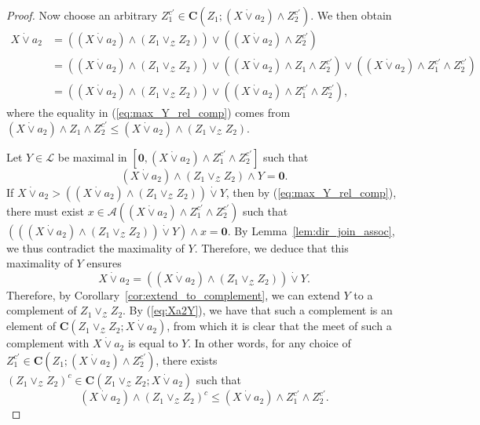 \documentclass[a4paper,11pt,reqno]{article}
\theoremstyle{definition}
\newcommand{\zero}{{\mathbf{0}}}
\begin{document}
\begin{proof}
Now choose an arbitrary $Z_1^{c'}\in\mathbf{C}(Z_1;(X\dot\vee a_2)\wedge Z_2^{c'})$. We then obtain
\begin{align}
    X \dot\vee a_2 &= ((X \dot\vee a_2) \wedge (Z_1 \vee_\mathcal{Z} Z_2)) \vee ((X \dot\vee a_2) \wedge Z_2^{c'})\nonumber \\
    &= ((X \dot\vee a_2) \wedge (Z_1 \vee_\mathcal{Z} Z_2)) \vee ((X \dot\vee a_2)\wedge Z_1 \wedge Z_2^{c'}) \vee ((X \dot\vee a_2)\wedge Z_1^{c'} \wedge Z_2^{c'})\nonumber \\
    &= ((X \dot\vee a_2) \wedge (Z_1 \vee_\mathcal{Z} Z_2)) \vee ((X \dot\vee a_2)\wedge Z_1^{c'} \wedge Z_2^{c'}),\label{eq:max_Y_rel_comp}
\end{align}
where the equality in (\ref{eq:max_Y_rel_comp}) comes from $(X\dot\vee a_2)\wedge Z_1\wedge Z_2^{c'}\leq(X\dot\vee a_2)\wedge (Z_1\vee_\mathcal{Z}Z_2)$.

Let $Y\in\mathcal{L}$ be maximal in $[\zero,(X\dot\vee a_2)\wedge Z_1^{c'}\wedge Z_2^{c'}]$ such that
$$(X\dot\vee a_2)\wedge(Z_1\vee_\mathcal{Z}Z_2)\wedge Y=\zero.$$
If $X\dot\vee a_2>((X\dot\vee a_2)\wedge(Z_1\vee_\mathcal{Z}Z_2))\dot\vee Y$, then by (\ref{eq:max_Y_rel_comp}), there must exist $x\in\mathcal{A}((X\dot\vee a_2)\wedge Z_1^{c'}\wedge Z_2^{c'})$ such that $(((X\dot\vee a_2)\wedge(Z_1\vee_\mathcal{Z}Z_2))\dot\vee Y)\wedge x=\zero$. By Lemma~\ref{lem:dir_join_assoc}, we thus contradict the maximality of $Y$.
Therefore, we deduce that this maximality of $Y$ ensures
\begin{equation}\label{eq:Xa2Y}
    X\dot\vee a_2=((X\dot\vee a_2)\wedge(Z_1\vee_\mathcal{Z}Z_2))\dot\vee Y.
\end{equation}
Therefore, by Corollary~\ref{cor:extend_to_complement}, we can extend $Y$ to a complement of $Z_1\vee_\mathcal{Z}Z_2$. By (\ref{eq:Xa2Y}), we have that such a complement is an element of $\mathbf{C}(Z_1\vee_\mathcal{Z}Z_2;X\dot\vee a_2)$, from which it is clear that the meet of such a complement with $X\dot\vee a_2$ is equal to $Y$. In other words, for any choice of $Z_1^{c'}\in\mathbf{C}(Z_1;(X\dot\vee a_2)\wedge Z_2^{c'})$, there exists $(Z_1\vee_\mathcal{Z}Z_2)^c\in\mathbf{C}(Z_1\vee_\mathcal{Z}Z_2;X\dot\vee a_2)$ such that
\begin{equation}\label{ineq:z1z2z1^c}
    (X\dot\vee a_2)\wedge (Z_1\vee_\mathcal{Z}Z_2)^c\leq(X\dot\vee a_2)\wedge Z_1^{c'}\wedge Z_2^{c'}.
\end{equation}


\end{proof}
\end{document}
